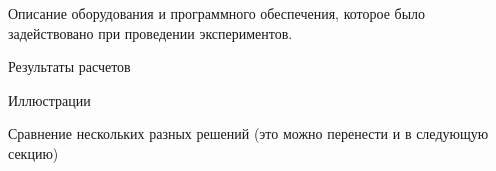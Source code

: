 \documentclass[sensors,article,submit,moreauthors,pdftex]{Definitions/mdpi}
\begin{document}
Описание оборудования и программного обеспечения, которое было задействовано при проведении экспериментов.

Результаты расчетов

Иллюстрации

Сравнение нескольких разных решений (это можно перенести и в следующую секцию)

%
%
%
%
%
%
%
\end{document}
